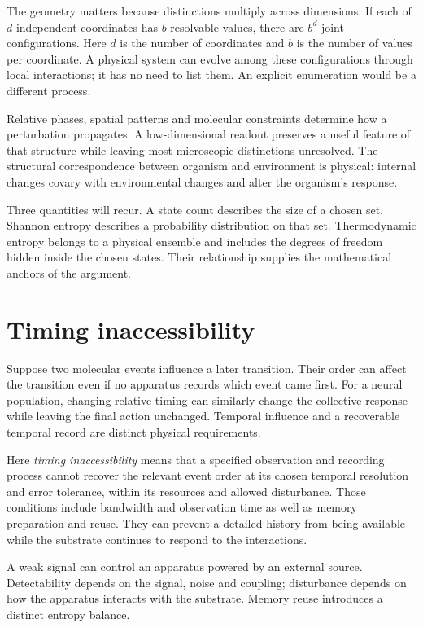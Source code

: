 \documentclass[10pt,a4paper,twocolumn]{article}
\numberwithin{equation}{section}
\begin{document}
The geometry matters because distinctions multiply across dimensions. If each of $d$ independent coordinates has $b$ resolvable values, there are $b^d$ joint configurations. Here $d$ is the number of coordinates and $b$ is the number of values per coordinate. A physical system can evolve among these configurations through local interactions; it has no need to list them. An explicit enumeration would be a different process.

Relative phases, spatial patterns and molecular constraints determine how a perturbation propagates. A low-dimensional readout preserves a useful feature of that structure while leaving most microscopic distinctions unresolved. The structural correspondence between organism and environment is physical: internal changes covary with environmental changes and alter the organism's response.

Three quantities will recur. A state count describes the size of a chosen set. Shannon entropy describes a probability distribution on that set. Thermodynamic entropy belongs to a physical ensemble and includes the degrees of freedom hidden inside the chosen states. Their relationship supplies the mathematical anchors of the argument.

\section{Timing inaccessibility}

Suppose two molecular events influence a later transition. Their order can affect the transition even if no apparatus records which event came first. For a neural population, changing relative timing can similarly change the collective response while leaving the final action unchanged. Temporal influence and a recoverable temporal record are distinct physical requirements.

Here \emph{timing inaccessibility} means that a specified observation and recording process cannot recover the relevant event order at its chosen temporal resolution and error tolerance, within its resources and allowed disturbance. Those conditions include bandwidth and observation time as well as memory preparation and reuse. They can prevent a detailed history from being available while the substrate continues to respond to the interactions.

A weak signal can control an apparatus powered by an external source. Detectability depends on the signal, noise and coupling; disturbance depends on how the apparatus interacts with the substrate. Memory reuse introduces a distinct entropy balance.
\end{document}
